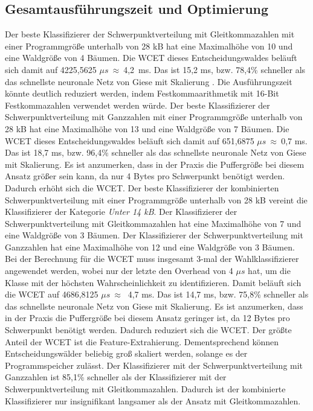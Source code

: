 \subsection{Gesamtausführungszeit und Optimierung}
Der beste Klassifizierer der Schwerpunktverteilung mit Gleitkommazahlen mit einer Programmgröße unterhalb von 28 kB hat eine Maximalhöhe von 10 und eine Waldgröße von 4 Bäumen. Die WCET dieses Entscheidungswaldes
beläuft sich damit auf 4225,5625 $\mu s\ \approx\ $4,2~ms. Das ist 15,2 ms, bzw. 78,4\% schneller als das schnellste neuronale Netz von Giese mit Skalierung \cite{gieseThesis}. Die Ausführungszeit könnte deutlich reduziert
werden, indem Festkommaarithmetik mit 16-Bit Festkommazahlen verwendet werden würde.
\newline
\newline
Der beste Klassifizierer der Schwerpunktverteilung mit Ganzzahlen mit einer Programmgröße unterhalb von 28 kB hat eine Maximalhöhe von 13 und eine Waldgröße von 7 Bäumen. Die WCET dieses Entscheidungswaldes
beläuft sich damit auf 651,6875 $\mu s\ \approx\ $0,7 ms. Das ist 18,7 ms, bzw. 96,4\% schneller als das schnellste neuronale Netz von Giese mit Skalierung. Es ist anzumerken, dass in der Praxis die Puffergröße
bei diesem Ansatz größer sein kann, da nur 4 Bytes pro Schwerpunkt benötigt werden. Dadurch erhöht sich die WCET.
\newline
\newline
Der beste Klassifizierer der kombinierten Schwerpunktverteilung mit einer Programmgröße unterhalb von 28 kB vereint die Klassifizierer der Kategorie \textit{Unter 14 kB}. Der Klassifizierer der Schwerpunktverteilung
mit Gleitkommazahlen hat eine Maximalhöhe von 7 und eine Waldgröße von 3 Bäumen. Der Klassifizierer der Schwerpunktverteilung mit Ganzzahlen hat eine Maximalhöhe von 12 und eine Waldgröße von 3 Bäumen. Bei der
Berechnung für die WCET muss insgesamt 3-mal der Wahlklassifizierer angewendet werden, wobei nur der letzte den Overhead von 4 $\mu s$ hat, um die Klasse mit der höchsten Wahrscheinlichkeit zu identifizieren. Damit
beläuft sich die WCET auf 4686,8125 $\mu s\ \approx\ $ 4,7 ms. Das ist 14,7 ms, bzw. 75,8\% schneller als das schnellste neuronale Netz von Giese mit Skalierung. Es ist anzumerken, dass in der Praxis die Puffergröße
bei diesem Ansatz geringer ist, da 12 Bytes pro Schwerpunkt benötigt werden. Dadurch reduziert sich die WCET.
\newline
\newline
Der größte Anteil der WCET ist die Feature-Extrahierung. Dementsprechend können Entscheidungswälder beliebig groß skaliert werden, solange es der Programmspeicher zulässt. Der Klassifizierer mit der Schwerpunktverteilung
mit Ganzzahlen ist 85,1\% schneller als der Klassifizierer mit der Schwerpunktverteilung mit Gleitkommazahlen. Dadurch ist der kombinierte Klassifizierer nur insignifikant langsamer als der Ansatz mit Gleitkommazahlen.